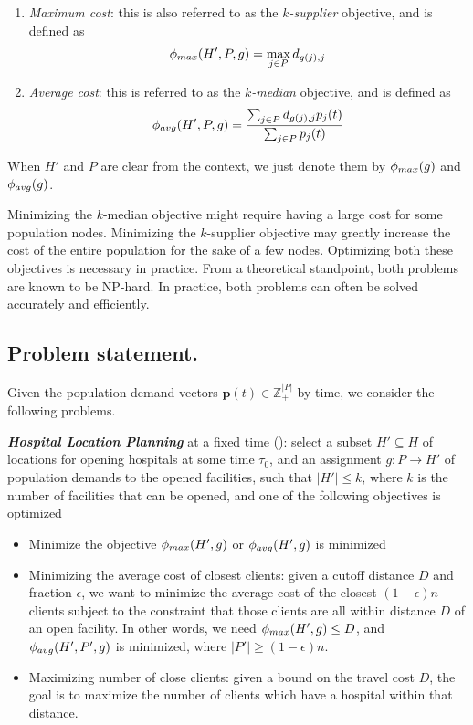 \begin{enumerate}
\item
\emph{Maximum cost}: this is also referred to as the \emph{$k$-supplier} objective, and is defined as
\[
\phi_{max}(H', P, g)=\max_{j\in P} d_{g(j),j}
\]
\item
\emph{Average cost}: this is referred to as the \emph{$k$-median} objective, and is defined as
\[
\phi_{avg}(H', P, g) = \frac{\sum_{j\in P} d_{g(j),j}p_j(t)}{\sum_{j\in P}p_j(t)}
\]
\end{enumerate}
When $H'$ and $P$ are clear from the context, we just denote them by $\phi_{max}(g)$ and $\phi_{avg}(g)$.

Minimizing the $k$-median objective might require having a large cost for
some population nodes. Minimizing the $k$-supplier objective may greatly increase the cost of the entire population for the sake of a few nodes. Optimizing both these objectives is necessary in practice. From a theoretical standpoint, both problems are known to be NP-hard. In practice, both problems can often be solved accurately and efficiently.


\subsection*{Problem statement.} 
Given the population demand vectors $\mathbf{p}(t) \in \mathbb{Z}_+^{|P|}$ by time, 
we consider the following problems.

\noindent
\textbf{\emph{Hospital Location Planning}} at a fixed time (\probstatic): select a subset $H' \subseteq H$ of locations 
for opening hospitals at some time $\tau_0$, and an assignment $g: P \rightarrow H'$ of population demands 
to the opened facilities, such that
$|H'|\leq k$, where $k$ is the number of facilities that can be opened, and
one of the following objectives is optimized
\begin{itemize}
\item 
Minimize the objective $\phi_{max}(H', g)$ or $\phi_{avg}(H', g)$ is minimized
\item
Minimizing the average cost of closest clients:
given a cutoff distance $D$ and fraction $\epsilon$, we want to minimize the average cost of the 
closest $(1-\epsilon)n$ clients subject to the constraint that those clients are all within 
distance $D$ of an open facility. In other words, we need $\phi_{max}(H', g)\leq D$, and 
$\phi_{avg}(H', P', g)$ is minimized, where $|P'|\geq (1-\epsilon)n$.
\item
Maximizing number of close clients:
given a bound on the travel cost $D$, the goal is to maximize the number of clients which have a 
hospital within that distance.
\end{itemize}

